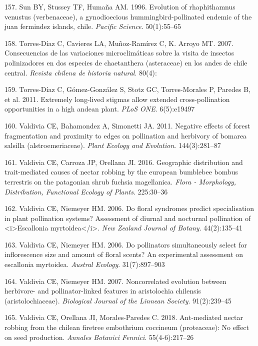 \documentclass[
]{article}
\begin{document}
\leavevmode\hypertarget{ref-RN77}{}%
157. Sun BY, Stussey TF, Humaña AM. 1996. Evolution of rhaphithamnus
venustus (verbenaceae), a gynodioecious hummingbird-pollinated endemic
of the juan fermindez islands, chile. \emph{Pacific Science}.
50(1):55--65

\leavevmode\hypertarget{ref-RN158}{}%
158. Torres-Díaz C, Cavieres LA, Muñoz-Ramírez C, K. Arroyo MT. 2007.
Consecuencias de las variaciones microclimáticas sobre la visita de
insectos polinizadores en dos especies de chaetanthera (asteraceae) en
los andes de chile central. \emph{Revista chilena de historia natural}.
80(4):

\leavevmode\hypertarget{ref-RN159}{}%
159. Torres-Díaz C, Gómez-González S, Stotz GC, Torres-Morales P,
Paredes B, et al. 2011. Extremely long-lived stigmas allow extended
cross-pollination opportunities in a high andean plant. \emph{PLoS ONE}.
6(5):e19497

\leavevmode\hypertarget{ref-RN162}{}%
160. Valdivia CE, Bahamondez A, Simonetti JA. 2011. Negative effects of
forest fragmentation and proximity to edges on pollination and herbivory
of bomarea salsilla (alstroemeriaceae). \emph{Plant Ecology and
Evolution}. 144(3):281--87

\leavevmode\hypertarget{ref-RN81}{}%
161. Valdivia CE, Carroza JP, Orellana JI. 2016. Geographic distribution
and trait-mediated causes of nectar robbing by the european bumblebee
bombus terrestris on the patagonian shrub fuchsia magellanica.
\emph{Flora - Morphology, Distribution, Functional Ecology of Plants}.
225:30--36

\leavevmode\hypertarget{ref-RN79}{}%
162. Valdivia CE, Niemeyer HM. 2006. Do floral syndromes predict
specialisation in plant pollination systems? Assessment of diurnal and
nocturnal pollination of \textless i\textgreater Escallonia
myrtoidea\textless/i\textgreater. \emph{New Zealand Journal of Botany}.
44(2):135--41

\leavevmode\hypertarget{ref-RN160}{}%
163. Valdivia CE, Niemeyer HM. 2006. Do pollinators simultaneously
select for inflorescence size and amount of floral scents? An
experimental assessment on escallonia myrtoidea. \emph{Austral Ecology}.
31(7):897--903

\leavevmode\hypertarget{ref-RN78}{}%
164. Valdivia CE, Niemeyer HM. 2007. Noncorrelated evolution between
herbivore- and pollinator-linked features in aristolochia chilensis
(aristolochiaceae). \emph{Biological Journal of the Linnean Society}.
91(2):239--45

\leavevmode\hypertarget{ref-RN5}{}%
165. Valdivia CE, Orellana JI, Morales-Paredes C. 2018. Ant-mediated
nectar robbing from the chilean firetree embothrium coccineum
(proteaceae): No effect on seed production. \emph{Annales Botanici
Fennici}. 55(4-6):217--26
\end{document}
